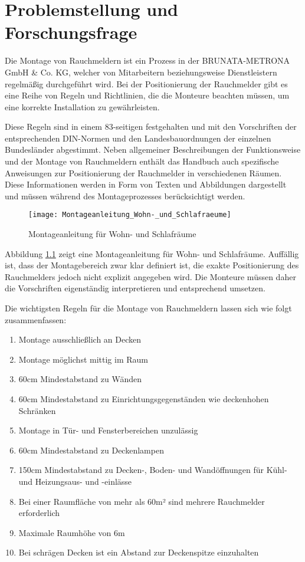 \chapter{Problemstellung und Forschungsfrage} \label{cha:Problemstellung}

Die Montage von Rauchmeldern ist ein Prozess in der BRUNATA-METRONA GmbH \& Co. KG, welcher von Mitarbeitern beziehungsweise Dienstleistern regelmäßig durchgeführt wird. Bei der Positionierung der Rauchmelder gibt es eine Reihe von Regeln und Richtlinien, die die Monteure beachten müssen, um eine korrekte Installation zu gewährleisten. 

Diese Regeln sind in einem 83-seitigen \citet{brunata2023handbuch} festgehalten und mit den Vorschriften der entsprechenden DIN-Normen und den Landesbauordnungen der einzelnen Bundesländer abgestimmt. Neben allgemeiner Beschreibungen der Funktionsweise und der Montage von Rauchmeldern enthält das Handbuch auch spezifische Anweisungen zur Positionierung der Rauchmelder in verschiedenen Räumen. Diese Informationen werden in Form von Texten und Abbildungen dargestellt und müssen während des Montageprozesses berücksichtigt werden.


\begin{figure}
\centering
\texttt{[image: Montageanleitung\_Wohn-\_und\_Schlafraeume]}
\caption{Montageanleitung für Wohn- und Schlafräume \cite{brunata2023handbuch}\label{fig:Anleitung}}\par
\end{figure}

Abbildung \ref{fig:Anleitung} zeigt eine Montageanleitung für Wohn- und Schlafräume. Auffällig ist, dass der Montagebereich zwar klar definiert ist, die exakte Positionierung des Rauchmelders jedoch nicht explizit angegeben wird. Die Monteure müssen daher die Vorschriften eigenständig interpretieren und entsprechend umsetzen.

Die wichtigsten Regeln für die Montage von Rauchmeldern lassen sich wie folgt zusammenfassen:

\begin{enumerate}
    \item Montage ausschließlich an Decken
    \item Montage möglichst mittig im Raum
    \item 60cm Mindestabstand zu Wänden
    \item 60cm Mindestabstand zu Einrichtungsgegenständen wie deckenhohen Schränken
    \item Montage in Tür- und Fensterbereichen unzulässig
    \item 60cm Mindestabstand zu Deckenlampen
    \item 150cm Mindestabstand zu Decken-, Boden- und Wandöffnungen für Kühl- und Heizungsaus- und -einlässe 
    \item Bei einer Raumfläche von mehr als 60m² sind mehrere Rauchmelder erforderlich
    \item Maximale Raumhöhe von 6m
    \item Bei schrägen Decken ist ein Abstand zur Deckenspitze einzuhalten
\end{enumerate}


